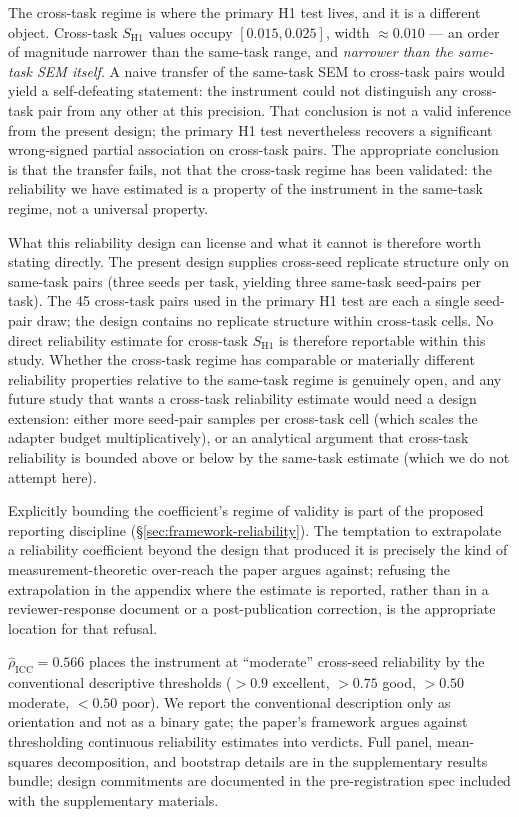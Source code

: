 \documentclass[10pt]{article}
\begin{document}
The cross-task regime is where the primary H1 test lives, and it is
a different object. Cross-task $S_{\mathrm{H1}}$ values occupy
$[0.015, 0.025]$, width $\approx 0.010$ --- an order of magnitude
narrower than the same-task range, and \emph{narrower than the
same-task SEM itself}. A naive transfer of the same-task SEM to
cross-task pairs would yield a self-defeating statement: the
instrument could not distinguish any cross-task pair from any
other at this precision. That conclusion is not a valid inference
from the present design; the primary H1 test nevertheless
recovers a significant wrong-signed partial association on
cross-task pairs. The appropriate conclusion is that the transfer
fails, not that the cross-task regime has been validated: the
reliability we have estimated is a property of the instrument in
the same-task regime, not a universal property.

What this reliability design can license and what it cannot is
therefore worth stating directly. The present design supplies
cross-seed replicate structure only on same-task pairs (three seeds
per task, yielding three same-task seed-pairs per task). The 45
cross-task pairs used in the primary H1 test are each a single
seed-pair draw; the design contains no replicate structure within
cross-task cells. No direct reliability estimate for cross-task
$S_{\mathrm{H1}}$ is therefore reportable within this study. Whether
the cross-task regime has comparable or materially different
reliability properties relative to the same-task regime is
genuinely open, and any future study that wants a cross-task
reliability estimate would need a design extension: either more
seed-pair samples per cross-task cell (which scales the adapter
budget multiplicatively), or an analytical argument that cross-task
reliability is bounded above or below by the same-task estimate
(which we do not attempt here).

Explicitly bounding the coefficient's regime of validity is part of
the proposed reporting discipline (\S\ref{sec:framework-reliability}).
The temptation to extrapolate a reliability coefficient beyond the
design that produced it is precisely the kind of
measurement-theoretic over-reach the paper argues against; refusing
the extrapolation in the appendix where the estimate is reported,
rather than in a reviewer-response document or a post-publication
correction, is the appropriate location for that refusal.

$\hat{\rho}_{\mathrm{ICC}} = 0.566$ places the instrument at
``moderate'' cross-seed reliability by the conventional descriptive
thresholds ($>\!0.9$ excellent, $>\!0.75$ good, $>\!0.50$ moderate,
$<\!0.50$ poor). We report the conventional description only as
orientation and not as a binary gate; the paper's framework argues
against thresholding continuous reliability estimates into
verdicts.
Full panel, mean-squares decomposition, and bootstrap
details are in the supplementary results bundle; design commitments
are documented in the pre-registration spec included with the
supplementary materials.
\end{document}
